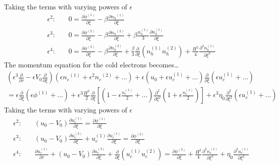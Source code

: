 \documentclass[a4paper, 12pt]{article}
\begin{document}
\noindent Taking the terms with varying powers of $\epsilon$
\begin{eqnarray}
    &\epsilon^2:& \quad 0 = \frac{\partial \phi^{(1)}}{\partial \xi} - \beta\frac{\partial {n_h}^{(1)}}{\partial \xi} \label{mom-h-ep2} \\
    &\epsilon^3:& \quad 0 = \frac{\partial \phi^{(2)}}{\partial \xi} - \beta\frac{\partial {n_h}^{(2)}}{\partial \xi} + \beta\frac{n_h^{(1)}}{3}\frac{\partial n_h^{(1)}}{\partial \xi} \label{mom-h-ep3} \\
    &\epsilon^4:& \quad 0 = \frac{\partial \phi^{(3)}}{\partial \xi} - \beta\frac{\partial n_h^{(3)}}{\partial \xi} + \frac{\beta}{3}\frac{\partial}{\partial \xi}(n_h^{(1)} n_h^{(2)}) + \frac{H^2}{4}\frac{\partial^3 n_h^{(1)}}{\partial \xi^3} \label{mom-h-ep4}
\end{eqnarray} 
\newpage
\noindent The momentum equation for the cold electrons becomes\dots\\
\begin{equation}
    \begin{split}
    (\epsilon^3 \frac{\partial}{\partial \tau} - \epsilon V_0 \frac{\partial}{\partial \xi})(\epsilon {n_c}^{(1)} + \epsilon^2 {n_c}^{(2)} + \dots) +
    \epsilon(u_0 + \epsilon u_c^{(1)} + \dots)\frac{\partial}{\partial \xi}(\epsilon u_c^{(1)} +\dots)\\ = \epsilon\frac{\partial}{\partial \xi}(\epsilon \phi^{(1)} +\dots) +
    \epsilon^3 \frac{H^2}{2}\frac{\partial}{\partial \xi}[(1- \epsilon\frac{n_c^{(1)}}{2} +\dots)\frac{\partial^2}{\partial\xi^2}(1+\epsilon\frac{n_c^{(1)}}{2})] +
    \epsilon^3\eta_0 \frac{\partial^2}{\partial\xi^2}(\epsilon u_c^{(1)} +\dots)
\end{split}
\end{equation}
Taking the terms with varying powers of $\epsilon$
\begin{eqnarray}
    &\epsilon^2:& \quad (u_0 - V_0)\frac{\partial u_c^{(1)}}{\partial\xi} = \frac{\partial\phi^{(1)}}{\partial\xi} \label{mom-c-ep2}\\
    &\epsilon^3:& \quad (u_0 - V_0)\frac{\partial u_c^{(2)}}{\partial\xi} + u_c^{(1)}\frac{\partial u_c^{(1)}}{\partial\xi} = \frac{\partial\phi^{(2)}}{\partial \xi} \label{mom-c-ep3}\\
    &\epsilon^4:& \quad \frac{\partial u_c^{(1)}}{\partial \tau} + (u_0 - V_0)\frac{\partial u_c^{(3)}}{\partial \xi} + \frac{\partial}{\partial \xi}(u_c^{(1)} u_c^{(2)})
    = \frac{\partial \phi^{(3)}}{\partial\xi} + \frac{H^2}{4}\frac{\partial^3 n_c^{(1)}}{\partial\xi^3} + \eta_0\frac{\partial^2 u_c^{(1)}}{\partial\xi^2} \label{mom-c-ep4}
\end{eqnarray}
\end{document}
